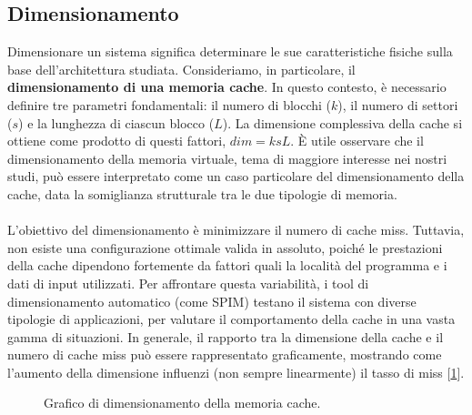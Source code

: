 \subsection{Dimensionamento}
Dimensionare un sistema significa determinare le sue caratteristiche fisiche sulla base dell'architettura studiata. Consideriamo, in particolare, il \textbf{dimensionamento di una memoria cache}. In questo contesto, è necessario definire tre parametri fondamentali: il numero di blocchi (\(k\)), il numero di settori (\(s\)) e la lunghezza di ciascun blocco (\(L\)). La dimensione complessiva della cache si ottiene come prodotto di questi fattori, \(dim=ksL\). È utile osservare che il dimensionamento della memoria virtuale, tema di maggiore interesse nei nostri studi, può essere interpretato come un caso particolare del dimensionamento della cache, data la somiglianza strutturale tra le due tipologie di memoria.
\\
\\
L’obiettivo del dimensionamento è minimizzare il numero di cache miss. Tuttavia, non esiste una configurazione ottimale valida in assoluto, poiché le prestazioni della cache dipendono fortemente da fattori quali la località del programma e i dati di input utilizzati. Per affrontare questa variabilità, i tool di dimensionamento automatico (come SPIM) testano il sistema con diverse tipologie di applicazioni, per valutare il comportamento della cache in una vasta gamma di situazioni. In generale, il rapporto tra la dimensione della cache e il numero di cache miss può essere rappresentato graficamente, mostrando come l’aumento della dimensione influenzi (non sempre linearmente) il tasso di miss [\ref{fig:graph_cache}].

\begin{figure}[!h]
\begin{center}
\end{center}
\caption{Grafico di dimensionamento della memoria cache.}
\label{fig:graph_cache}
\end{figure}

